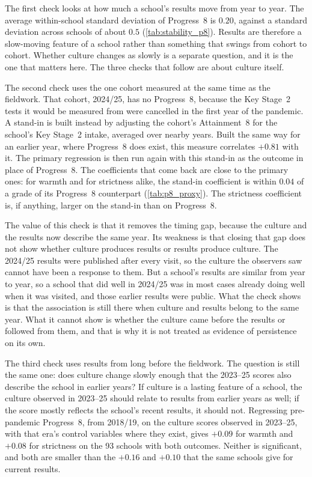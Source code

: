 The first check looks at how much a school's results move from year to year. The average within-school standard deviation of Progress~8 is $0.20$, against a standard deviation across schools of about $0.5$ (\cref{tab:stability_p8}). Results are therefore a slow-moving feature of a school rather than something that swings from cohort to cohort. Whether culture changes as slowly is a separate question, and it is the one that matters here. The three checks that follow are about culture itself.

The second check uses the one cohort measured at the same time as the fieldwork. That cohort, 2024/25, has no Progress~8, because the Key Stage~2 tests it would be measured from were cancelled in the first year of the pandemic. A stand-in is built instead by adjusting the cohort's Attainment~8 for the school's Key Stage~2 intake, averaged over nearby years. Built the same way for an earlier year, where Progress~8 does exist, this measure correlates $+0.81$ with it. The primary regression is then run again with this stand-in as the outcome in place of Progress~8. The coefficients that come back are close to the primary ones: for warmth and for strictness alike, the stand-in coefficient is within $0.04$ of a grade of its Progress~8 counterpart (\cref{tab:p8_proxy}). The strictness coefficient is, if anything, larger on the stand-in than on Progress~8.

The value of this check is that it removes the timing gap, because the culture and the results now describe the same year. Its weakness is that closing that gap does not show whether culture produces results or results produce culture. The 2024/25 results were published after every visit, so the culture the observers saw cannot have been a response to them. But a school's results are similar from year to year, so a school that did well in 2024/25 was in most cases already doing well when it was visited, and those earlier results were public. What the check shows is that the association is still there when culture and results belong to the same year. What it cannot show is whether the culture came before the results or followed from them, and that is why it is not treated as evidence of persistence on its own.

The third check uses results from long before the fieldwork. The question is still the same one: does culture change slowly enough that the 2023--25 scores also describe the school in earlier years? If culture is a lasting feature of a school, the culture observed in 2023--25 should relate to results from earlier years as well; if the score mostly reflects the school's recent results, it should not. Regressing pre-pandemic Progress~8, from 2018/19, on the culture scores observed in 2023--25, with that era's control variables where they exist, gives $+0.09$ for warmth and $+0.08$ for strictness on the 93 schools with both outcomes. Neither is significant, and both are smaller than the $+0.16$ and $+0.10$ that the same schools give for current results.

